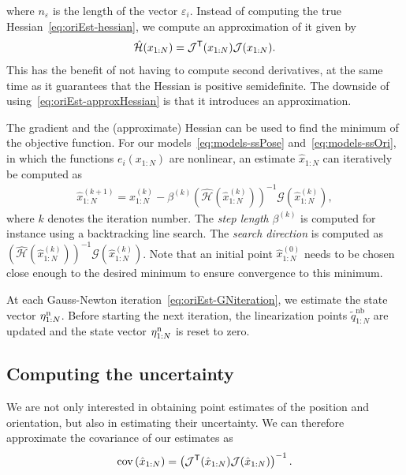 \documentclass{article}
\begin{document}
where $n_\varepsilon$ is the length of the vector $\varepsilon_i$. Instead of computing the true Hessian~\eqref{eq:oriEst-hessian}, we compute an approximation of it given by
\begin{align}
\label{eq:oriEst-approxHessian}
\mathcal{\hat{H}}(x_{1:N}) = \mathcal{J}^{\mathsf{T}}(x_{1:N}) \mathcal{J}(x_{1:N}).
\end{align}
This has the benefit of not having to compute second derivatives, at the same time as it guarantees that the Hessian is positive semidefinite. The downside of using~\eqref{eq:oriEst-approxHessian} is that it introduces an approximation.

The gradient and the (approximate) Hessian can be used to find the minimum of the objective function. For our models~\eqref{eq:models-ssPose} and~\eqref{eq:models-ssOri}, in which the functions $e_i(x_{1:N})$ are nonlinear, an estimate $\hat{x}_{1:N}$ can iteratively be computed as
\begin{align}
\label{eq:oriEst-GNiteration}
\hat x_{1:N}^{(k+1)} = \hat x_{1:N}^{(k)} - \beta^{(k)} \left( \mathcal{\hat{H}}(\hat x_{1:N}^{(k)}) \right)^{-1} \mathcal{G}(\hat x_{1:N}^{(k)}),
\end{align}
where $k$ denotes the iteration number. The \emph{step length} $\beta^{(k)}$ is computed for instance using a backtracking line search. The \emph{search direction} is computed as $\left( \mathcal{\hat{H}}(\hat x_{1:N}^{(k)}) \right)^{-1} \mathcal{G}(\hat x_{1:N}^{(k)})$. Note that an initial point $\hat{x}_{1:N}^{(0)}$ needs to be chosen close enough to the desired minimum to ensure convergence to this minimum. 

At each Gauss-Newton iteration~\eqref{eq:oriEst-GNiteration}, we estimate the state vector $\eta_{1:N}^\text{n}$. Before starting the next iteration, the linearization points $\tilde{q}^\text{nb}_{1:N}$ are updated and the state vector $\eta_{1:N}^\text{n}$ is reset to zero.

\subsection{Computing the uncertainty}

We are not only interested in obtaining point estimates of the position and orientation, but also in estimating their uncertainty.
We can therefore approximate the covariance of our estimates as
\begin{align}
\operatorname{cov}{ (\hat{x}_{1:N}) } = \left( \mathcal{J}^{\mathsf{T}}(\hat{x}_{1:N}) \mathcal{J}(\hat{x}_{1:N}) \right)^{-1}.
\end{align}
\end{document}
